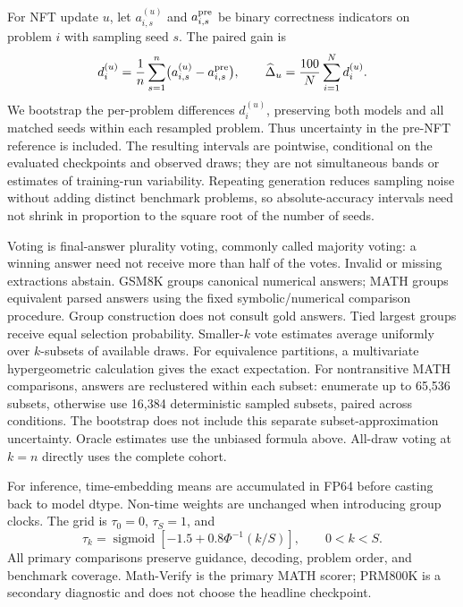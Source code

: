 For NFT update $u$, let $a_{i,s}^{(u)}$ and $a_{i,s}^{\rm pre}$ be binary correctness indicators on problem $i$ with sampling seed $s$. The paired gain is
\begin{equation}
 d_i^{(u)}=\frac{1}{n}\sum_{s=1}^{n}\bigl(a_{i,s}^{(u)}-a_{i,s}^{\rm pre}\bigr),
 \qquad \widehat\Delta_u=\frac{100}{N}\sum_{i=1}^{N}d_i^{(u)}.
\end{equation}
We bootstrap the per-problem differences $d_i^{(u)}$, preserving both models and all matched seeds within each resampled problem. Thus uncertainty in the pre-NFT reference is included. The resulting intervals are pointwise, conditional on the evaluated checkpoints and observed draws; they are not simultaneous bands or estimates of training-run variability. Repeating generation reduces sampling noise without adding distinct benchmark problems, so absolute-accuracy intervals need not shrink in proportion to the square root of the number of seeds.

Voting is final-answer plurality voting, commonly called majority voting: a winning answer need not receive more than half of the votes. Invalid or missing extractions abstain. GSM8K groups canonical numerical answers; MATH groups equivalent parsed answers using the fixed symbolic/numerical comparison procedure. Group construction does not consult gold answers. Tied largest groups receive equal selection probability. Smaller-$k$ vote estimates average uniformly over $k$-subsets of available draws. For equivalence partitions, a multivariate hypergeometric calculation gives the exact expectation. For nontransitive MATH comparisons, answers are reclustered within each subset: enumerate up to 65,536 subsets, otherwise use 16,384 deterministic sampled subsets, paired across conditions. The bootstrap does not include this separate subset-approximation uncertainty. Oracle estimates use the unbiased formula above. All-draw voting at $k=n$ directly uses the complete cohort.

For inference, time-embedding means are accumulated in FP64 before casting back to model dtype. Non-time weights are unchanged when introducing group clocks. The grid is $\tau_0=0$, $\tau_S=1$, and
\begin{equation}
 \tau_k=\operatorname{sigmoid}\left[-1.5+0.8\Phi^{-1}(k/S)\right],\qquad 0<k<S.
\end{equation}
All primary comparisons preserve guidance, decoding, problem order, and benchmark coverage. Math-Verify is the primary MATH scorer; PRM800K is a secondary diagnostic and does not choose the headline checkpoint.

